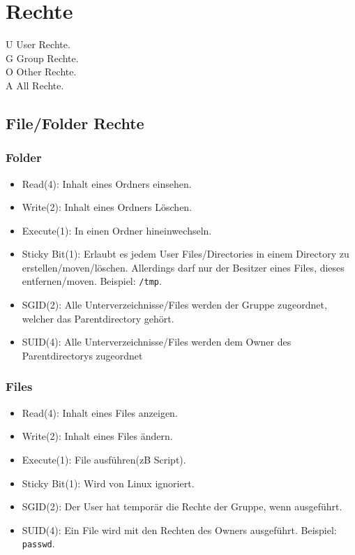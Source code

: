 \documentclass{article}
\newcommand{\cmdinline}[1]{\texttt{#1}}
\begin{document}
\section{Rechte}
U User Rechte.\\
G Group Rechte.\\
O Other Rechte.\\
A All Rechte.\\

\subsection{File/Folder Rechte}
\subsubsection{Folder}
\begin{itemize}
\item Read(4): Inhalt eines Ordners einsehen.
\item Write(2): Inhalt eines Ordners Löschen.
\item Execute(1): In einen Ordner hineinwechseln.
\item Sticky Bit(1):
  Erlaubt es jedem User Files/Directories in einem Directory zu erstellen/moven/löschen.
  Allerdings darf nur der Besitzer eines Files, dieses entfernen/moven.
  Beispiel: \cmdinline{/tmp}.
\item SGID(2):
  Alle Unterverzeichnisse/Files werden der Gruppe zugeordnet,
  welcher das Parentdirectory gehört.
\item SUID(4):
  Alle Unterverzeichnisse/Files werden dem Owner des Parentdirectorys zugeordnet
\end{itemize}

\subsubsection{Files}
\begin{itemize}
\item Read(4): Inhalt eines Files anzeigen.
\item Write(2): Inhalt eines Files ändern.
\item Execute(1): File ausführen(zB Script).
\item Sticky Bit(1): Wird von Linux ignoriert.
\item SGID(2): Der User hat temporär die Rechte der Gruppe, wenn ausgeführt.
\item SUID(4):
  Ein File wird mit den Rechten des Owners ausgeführt. Beispiel: \cmdinline{passwd}.
\end{itemize}
\end{document}
